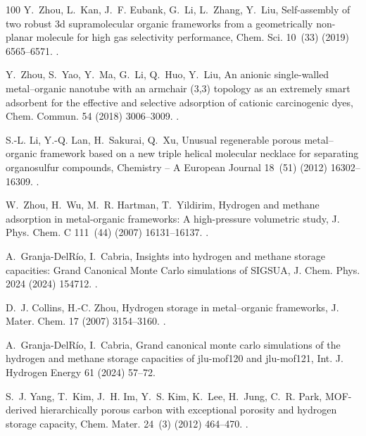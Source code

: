 \documentclass[review]{elsarticle}
\begin{document}
\begin{thebibliography}{100}
Y.~Zhou, L.~Kan, J.~F. Eubank, G.~Li, L.~Zhang, Y.~Liu, Self-assembly of two
  robust 3d supramolecular organic frameworks from a geometrically non-planar
  molecule for high gas selectivity performance, Chem. Sci. 10~(33) (2019)
  6565--6571.
\newblock \href {https://doi.org/10.1039/C9SC00290A}
  {}.

Y.~Zhou, S.~Yao, Y.~Ma, G.~Li, Q.~Huo, Y.~Liu, An anionic single-walled
  metal–organic nanotube with an armchair (3{,}3) topology as an extremely
  smart adsorbent for the effective and selective adsorption of cationic
  carcinogenic dyes, Chem. Commun. 54 (2018) 3006--3009.
\newblock \href {https://doi.org/10.1039/C8CC00542G}
  {}.

S.-L. Li, Y.-Q. Lan, H.~Sakurai, Q.~Xu, Unusual regenerable porous
  metal–organic framework based on a new triple helical molecular necklace
  for separating organosulfur compounds, Chemistry – A European Journal
  18~(51) (2012) 16302--16309.
\newblock \href {https://doi.org/10.1002/chem.201203093}
  {}.

W.~Zhou, H.~Wu, M.~R. Hartman, T.~Yildirim, Hydrogen and methane adsorption in
  metal-organic frameworks: A high-pressure volumetric study, J. Phys. Chem. C
  111~(44) (2007) 16131--16137.
\newblock \href {https://doi.org/10.1021/jp074889i}
  {}.

A.~Granja-DelRío, I.~Cabria, Insights into hydrogen and methane storage
  capacities: {G}rand {C}anonical {M}onte {C}arlo simulations of {SIGSUA}, J.
  Chem. Phys. 2024 (2024) 154712.
\newblock \href {https://doi.org/10.1063/5.0193291}
  {}.

D.~J. Collins, H.-C. Zhou, Hydrogen storage in metal–organic frameworks, J.
  Mater. Chem. 17 (2007) 3154--3160.
\newblock \href {https://doi.org/10.1039/B702858J}
  {}.

A.~Granja-DelRío, I.~Cabria, Grand canonical monte carlo simulations of the
  hydrogen and methane storage capacities of jlu-mof120 and jlu-mof121, Int. J.
  Hydrogen Energy 61 (2024) 57--72.

S.~J. Yang, T.~Kim, J.~H. Im, Y.~S. Kim, K.~Lee, H.~Jung, C.~R. Park,
  {MOF}-derived hierarchically porous carbon with exceptional porosity and
  hydrogen storage capacity, Chem. Mater. 24~(3) (2012) 464--470.
\newblock \href {https://doi.org/10.1021/cm202554j}
  {}.


\end{thebibliography}
\end{document}
